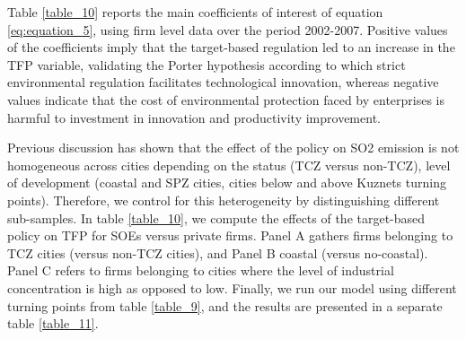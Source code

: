 \documentclass[12pt]{article}
\begin{document}
Table \ref{table_10} reports the main coefficients of interest of equation \ref{eq:equation_5}, using firm level data over the period 2002-2007. Positive values of the coefficients imply that the target-based regulation led to an increase in the TFP variable, validating the Porter hypothesis according to which strict environmental regulation facilitates technological innovation, whereas negative values indicate that the cost of environmental protection faced by enterprises is harmful to investment in innovation and productivity improvement. 


Previous discussion has shown that the effect of the policy on SO2 emission is not homogeneous across cities depending on the status (TCZ versus non-TCZ), level of development (coastal and SPZ cities, cities below and above Kuznets turning points). Therefore, we control for this heterogeneity by distinguishing different sub-samples. In table \ref{table_10}, we compute the effects of the target-based policy on TFP for SOEs versus private firms. Panel A gathers firms belonging to TCZ cities (versus non-TCZ cities), and Panel B coastal (versus no-coastal). Panel C refers to firms belonging to cities where the level of industrial concentration is high as opposed to low. Finally, we run our model using different turning points from table \ref{table_9}, and the results are presented in a separate table \ref{table_11}. 
\end{document}

